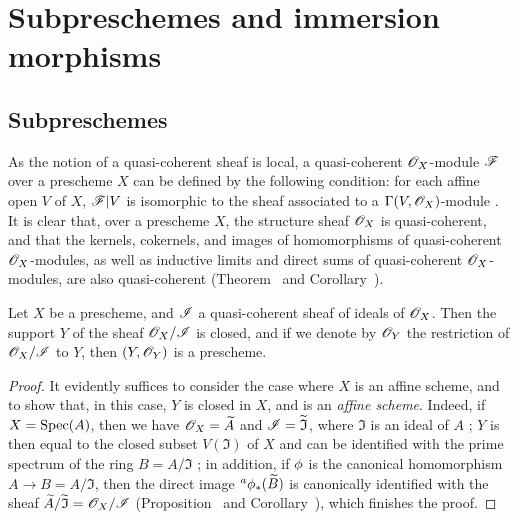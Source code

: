 \section{Subpreschemes and immersion morphisms}
\label{section:I.4}

\subsection{Subpreschemes}
\label{subsection:I.4.1}

\begin{env}[4.1.1]
\label{I.4.1.1}
As the notion of a quasi-coherent sheaf  is local, a quasi-coherent $\mathscr{O}_X$-module $\mathscr{F}$ over a prescheme $X$ can be defined by the following condition: for each affine open $V$ of $X$, $\mathscr{F}|V$ is isomorphic to the sheaf associated to a $\Gamma(V,\mathscr{O}_X)$-module .
It is clear that, over a prescheme $X$, the structure sheaf $\mathscr{O}_X$ is quasi-coherent, and that the kernels, cokernels, and images of homomorphisms of quasi-coherent $\mathscr{O}_X$-modules, as well as inductive limits and direct sums of quasi-coherent $\mathscr{O}_X$-modules, are also quasi-coherent (Theorem~ and Corollary~).
\end{env}

\begin{proposition}[4.1.2]
\label{I.4.1.2}
Let $X$ be a prescheme, and $\mathscr{I}$ a quasi-coherent sheaf of ideals of $\mathscr{O}_X$.
Then the support $Y$ of the sheaf $\mathscr{O}_X/\mathscr{I}$ is closed, and if we denote by $\mathscr{O}_Y$ the restriction of $\mathscr{O}_X/\mathscr{I}$ to $Y$, then $(Y,\mathscr{O}_Y)$ is a prescheme.
\end{proposition}

\begin{proof}
It evidently suffices  to consider the case where $X$ is an affine scheme, and to show that, in this case, $Y$ is closed in $X$, and is an \emph{affine scheme}.
Indeed, if $X=\operatorname{Spec}(A)$, then we have $\mathscr{O}_X=\widetilde{A}$ and $\mathscr{I}=\widetilde{\mathfrak{I}}$, where $\mathfrak{I}$ is an ideal of $A$ ;
$Y$ is then equal to the closed subset $V(\mathfrak{I})$ of $X$ and can be identified with the prime spectrum of the ring $B=A/\mathfrak{I}$ ;
in addition, if $\phi$ is the canonical homomorphism $A\to B=A/\mathfrak{I}$, then the direct image ${}^a\phi_*(\widetilde{B})$ is canonically identified with the sheaf $\widetilde{A}/\widetilde{\mathfrak{I}}=\mathscr{O}_X/\mathscr{I}$ (Proposition~ and Corollary~), which finishes the proof.
\end{proof}

